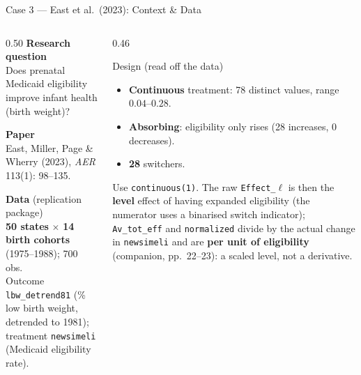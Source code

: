 \documentclass[main.tex]{subfiles}
\begin{document}
\begin{frame}{Case 3 --- East et al.\ (2023): Context \& Data}

  \begin{columns}[T]
    \begin{column}{0.50\textwidth}
      \textbf{Research question}\\
      Does prenatal Medicaid eligibility improve infant health (birth
      weight)?

      \medskip
      \textbf{Paper}\\
      East, Miller, Page \& Wherry (2023), \textit{AER} 113(1): 98--135.

      \medskip
      \textbf{Data} (replication package)\\
      \textbf{50 states} $\times$ \textbf{14 birth cohorts} (1975--1988);
      700 obs.\\[3pt]
      Outcome \texttt{lbw\_detrend81} (\% low birth weight, detrended to
      1981); treatment \texttt{newsimeli} (Medicaid eligibility rate).
    \end{column}
    \begin{column}{0.46\textwidth}
      \begin{block}{Design (read off the data)}
        \footnotesize
        \begin{itemize}\footnotesize
          \item \textbf{Continuous} treatment: 78 distinct values,
            range $0.04$--$0.28$.
          \item \textbf{Absorbing}: eligibility only rises (28 increases,
            0 decreases).
          \item \textbf{28} switchers.
        \end{itemize}
      \end{block}

      \smallskip
      \footnotesize Use \texttt{continuous(1)}. The raw \texttt{Effect\_}$\ell$
      is then the \textbf{level} effect of having expanded eligibility (the
      numerator uses a binarised switch indicator); \texttt{Av\_tot\_eff} and
      \texttt{normalized} divide by the actual change in \texttt{newsimeli}
      and are \textbf{per unit of eligibility} (companion, pp.~22--23): a
      scaled level, not a derivative.
    \end{column}
  \end{columns}

\end{frame}
\end{document}

